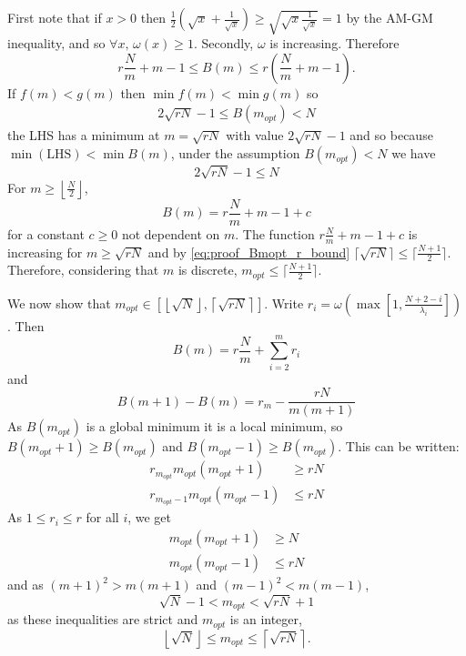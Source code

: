 First note that if $x > 0$ then $ \frac{1}{2}\left(\sqrt{x} + \frac{1}{\sqrt{x}}\right) \geq \sqrt{\sqrt{x}\frac{1}{\sqrt{x}}} = 1$ by the AM-GM inequality, and so $\forall x, \, \omega(x) \geq 1$. Secondly, $\omega$ is increasing. Therefore
\begin{equation}
    r\frac{N}{m} + m - 1 \leq B(m) \leq r\left(\frac{N}{m} + m - 1\right).
\end{equation}
If $f(m) < g(m)$ then $\min f(m) < \min g(m)$ so
\begin{align}
    2\sqrt{rN} - 1 \leq B(m_{opt}) < N
\end{align}
the LHS has a minimum at $m=\sqrt{rN}$ with value $2\sqrt{rN} - 1$ and so because $\min(\text{LHS}) < \min B(m)$, under the assumption $B(m_{opt}) < N$ we have
\begin{equation}
    2\sqrt{rN} -1 \leq N \label{eq:proof_Bmopt_r_bound}
\end{equation}
For $m \geq \left\lfloor \frac{N}{2}\right\rfloor$,
\begin{equation}
    B(m) = r\frac{N}{m} + m - 1 + c
\end{equation}
for a constant $c \geq 0$ not dependent on $m$. The function $r\frac{N}{m} + m - 1 + c$ is increasing for $m \geq \sqrt{rN}$ and by \ref{eq:proof_Bmopt_r_bound} $\lceil\sqrt{rN}\rceil \leq \lceil\frac{N+1}{2}\rceil$. Therefore, considering that $m$ is discrete, $m_{opt} \leq \lceil\frac{N+1}{2}\rceil$.

We now show that $m_{opt} \in \left[ \left\lfloor \sqrt{N} \right\rfloor, \left\lceil \sqrt{rN} \right\rceil \right]$. Write $r_{i} = \omega\left(\max\left[1,\frac{N+2-i}{\lambda_{i}}\right]\right)$. Then 
\begin{equation}
    B(m) = r\frac{N}{m} + \sum_{i=2}^{m} r_{i}
\end{equation}
and
\begin{equation}
    B(m+1) - B(m) = r_{m} - \frac{rN}{m(m+1)}
\end{equation}
As $B(m_{opt})$ is a global minimum it is a local minimum, so
$B(m_{opt} + 1) \geq B(m_{opt})$ and $B(m_{opt} - 1) \geq B(m_{opt})$. This can be written:
\begin{align}
     r_{m_{opt}} m_{opt}(m_{opt} + 1)&\geq rN \\
    r_{m_{opt}-1}m_{opt}(m_{opt} - 1) &\leq rN
\end{align}
As $1 \leq r_{i} \leq r$ for all $i$, we get
\begin{align}
    m_{opt}(m_{opt} + 1)&\geq N  \\
    m_{opt}(m_{opt} - 1) &\leq rN 
\end{align}
and as $(m+1)^{2} > m(m+1)$ and $(m-1)^{2} < m(m-1)$,
\begin{equation}
    \sqrt{N} - 1 < m_{opt} < \sqrt{rN} + 1
\end{equation}
as these inequalities are strict and $m_{opt}$ is an integer,
\begin{equation}
\left\lfloor\sqrt{N}\right\rfloor \leq m_{opt} \leq \left\lceil\sqrt{rN}\right\rceil.
\end{equation}
\iffalse
